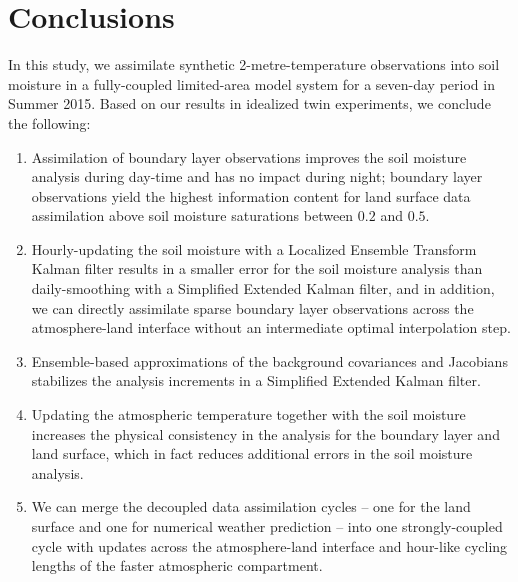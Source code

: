 \documentclass[HESSD, manuscript]{copernicus}
\begin{document}
\section{Conclusions}
In this study, we assimilate synthetic 2-metre-temperature observations into soil moisture in a fully-coupled limited-area model system for a seven-day period in Summer 2015.
Based on our results in idealized twin experiments, we conclude the following:
\begin{enumerate}
	\item Assimilation of boundary layer observations improves the soil moisture analysis during day-time and has no impact during night; boundary layer observations yield the highest information content for land surface data assimilation above soil moisture saturations between $0.2$ and $0.5$. 
	\item Hourly-updating the soil moisture with a Localized Ensemble Transform Kalman filter results in a smaller error for the soil moisture analysis than daily-smoothing with a Simplified Extended Kalman filter, and in addition, we can directly assimilate sparse boundary layer observations across the atmosphere-land interface without an intermediate optimal interpolation step.
	\item Ensemble-based approximations of the background covariances and Jacobians stabilizes the analysis increments in a Simplified Extended Kalman filter.
	\item Updating the atmospheric temperature together with the soil moisture increases the physical consistency in the analysis for the boundary layer and land surface, which in fact reduces additional errors in the soil moisture analysis.
	\item We can merge the decoupled data assimilation cycles -- one for the land surface and one for numerical weather prediction -- into one strongly-coupled cycle with updates across the atmosphere-land interface and hour-like cycling lengths of the faster atmospheric compartment.
\end{enumerate}



\end{document}
